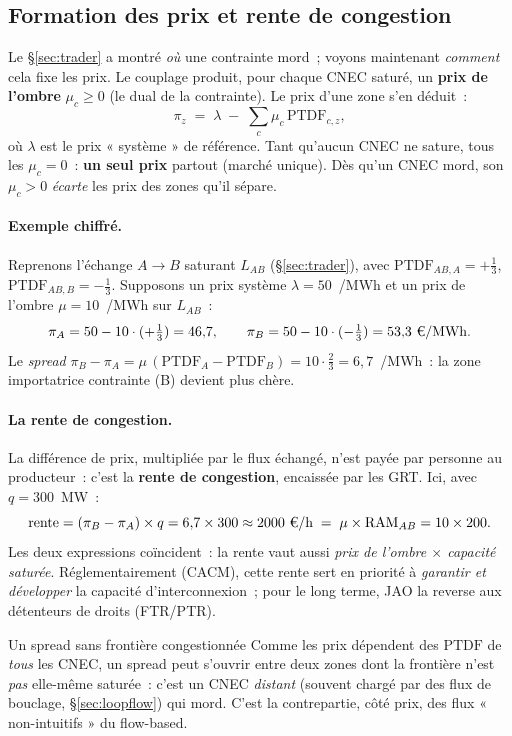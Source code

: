\documentclass[11pt,a4paper]{article}
\providecommand{\euro}{\texteuro}
\newcommand{\PTDF}{\mathrm{PTDF}}
\newcommand{\RAM}{\mathrm{RAM}}
\begin{document}
\subsection{Formation des prix et rente de congestion}
\label{sec:prix}

Le \S\ref{sec:trader} a montré \emph{où} une contrainte mord~; voyons
maintenant \emph{comment} cela fixe les prix. Le couplage produit, pour chaque
CNEC saturé, un \textbf{prix de l'ombre} $\mu_c\ge 0$ (le dual de la
contrainte). Le prix d'une zone s'en déduit~:
\[
  \pi_z \;=\; \lambda \;-\; \sum_c \mu_c\,\PTDF_{c,z},
\]
où $\lambda$ est le prix « système » de référence. Tant qu'aucun CNEC ne
sature, tous les $\mu_c=0$~: \textbf{un seul prix} partout (marché unique).
Dès qu'un CNEC mord, son $\mu_c>0$ \emph{écarte} les prix des zones qu'il
sépare.

\paragraph{Exemple chiffré.} Reprenons l'échange $A\!\to\!B$ saturant $L_{AB}$
(\S\ref{sec:trader}), avec $\PTDF_{AB,A}=+\tfrac13$, $\PTDF_{AB,B}=-\tfrac13$.
Supposons un prix système $\lambda=50$~\euro{}/MWh et un prix de l'ombre
$\mu=10$~\euro{}/MWh sur $L_{AB}$~:
\[
  \pi_A = 50 - 10\cdot(+\tfrac13) = 46{,}7,\qquad
  \pi_B = 50 - 10\cdot(-\tfrac13) = 53{,}3\ \text{\euro{}/MWh}.
\]
Le \emph{spread} $\pi_B-\pi_A = \mu\,(\PTDF_{A}-\PTDF_{B}) = 10\cdot\tfrac23 =
6{,}7$~\euro{}/MWh~: la zone importatrice contrainte (B) devient plus chère.

\paragraph{La rente de congestion.} La différence de prix, multipliée par le
flux échangé, n'est payée par personne au producteur~: c'est la \textbf{rente
de congestion}, encaissée par les GRT. Ici, avec $q=300$~MW~:
\[
  \text{rente} = (\pi_B-\pi_A)\times q = 6{,}7\times 300 \approx 2000\ \text{\euro{}/h}
  \;=\; \mu\times\RAM_{AB}=10\times 200 .
\]
Les deux expressions coïncident~: la rente vaut aussi \emph{prix de l'ombre
$\times$ capacité saturée}. Réglementairement (CACM), cette rente sert en
priorité à \emph{garantir et développer} la capacité d'interconnexion~; pour
le long terme, JAO la reverse aux détenteurs de droits (FTR/PTR).

\begin{rembox}{Un spread sans frontière congestionnée}
Comme les prix dépendent des $\PTDF$ de \emph{tous} les CNEC, un spread peut
s'ouvrir entre deux zones dont la frontière n'est \emph{pas} elle-même
saturée~: c'est un CNEC \emph{distant} (souvent chargé par des flux de
bouclage, \S\ref{sec:loopflow}) qui mord. C'est la contrepartie, côté prix,
des flux « non-intuitifs » du flow-based.
\end{rembox}
\end{document}
